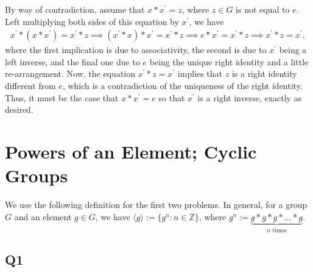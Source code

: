 \documentclass[12pt]{article}
\def\Z{{\mathbb Z}}        %
\numberwithin{theorem}{section}
\numberwithin{equation}{section}
\numberwithin{remark}{section}
\numberwithin{definition}{section}
\numberwithin{theorem}{section}
\numberwithin{lemma}{section}
\numberwithin{example}{section}
\begin{document}
By way of contradiction, assume that $x*x^\prime = z$, where $z\in G$ is not equal to $e$. Left multiplying both sides of this equation by $x^\prime$, we have
\begin{align*}
	x^\prime*(x*x^\prime) = x^\prime*z \implies (x^\prime*x)*x^\prime = x^\prime*z \implies e*x^\prime = x^\prime* z \implies x^\prime * z = x^\prime,
\end{align*}
where the first implication is due to associativity, the second is due to $x^\prime$ being a left inverse, and the final one due to $e$ being the unique right identity and a little re-arrangement. Now, the equation $x^\prime * z = x^\prime$ implies that $z$ is a right identity different from $e$, which is a contradiction of the uniqueness of the right identity. Thus, it must be the case that $x*x^\prime = e$ so that $x^\prime$ is a right inverse, exactly as desired. 



\newpage

\section{Powers of an Element; Cyclic Groups}

We use the following definition for the first two problems. In general, for a group $G$ and an element $g\in G$, we have $\langle g \rangle:=\{g^n:n\in\Z\}$, where $g^n:=\underbrace{g*g*g*\ldots*g}_{n\text{ times}}$.

\subsection{Q1}
\end{document}
